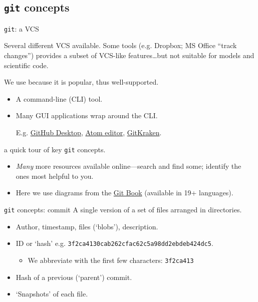 \documentclass[12pt,aspectratio=169]{beamer}
\begin{document}
\subsection{\texttt{git} concepts}
\begin{frame}{\texttt{git}: a VCS}

Several different VCS available.
Some tools (e.g. Dropbox; MS Office “track changes”) provides a subset of VCS-like features…but not suitable for models and scientific code.

\bigskip
We use  because it is popular, thus well-supported.
\begin{itemize}
  \item A command-line (CLI) tool.
  \item Many GUI applications wrap around the CLI.

    E.g.
    \href{https://desktop.github.com/}{GitHub Desktop},
    \href{https://github.atom.io/}{Atom editor},
    \href{https://www.gitkraken.com/}{GitKraken}.
\end{itemize}

\bigskip
{} a quick tour of key \texttt{git} concepts.
\begin{itemize}
  \item \emph{Many} more resources available online—search and find some;
    identify the ones most helpful to you.
  \item Here we use diagrams from the \href{https://git-scm.com/book/en/v2/Getting-Started-What-is-Git\%3F}{Git Book} (available in 19+ languages).
\end{itemize}
\end{frame}

\begin{frame}[fragile]{\texttt{git} concepts: commit} \large
A single version of a set of files arranged in directories.

\bigskip
\begin{itemize}
  \item Author, timestamp, files (‘blobs’), description.
  \item ID or ‘hash’ e.g. \texttt{3f2ca4130cab262cfac62c5a98dd2ebdeb424dc5}.
    \begin{itemize}
      \item We abbreviate with the first few characters: \texttt{3f2ca413}
    \end{itemize}
  \item Hash of a previous (‘parent’) commit.
  \item ‘Snapshots’ of each file.
\end{itemize}
\end{frame}
\end{document}
